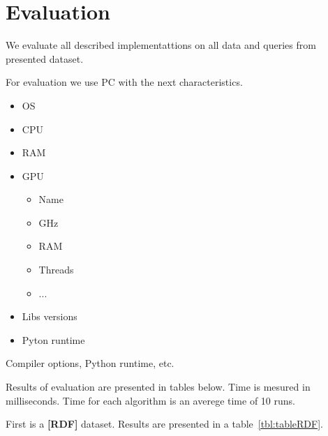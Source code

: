 \section{Evaluation}

We evaluate all described implementattions on all data and queries from presented dataset.

For evaluation we use PC with the next characteristics.
\begin{itemize}
  \item OS
  \item CPU
  \item RAM
  \item GPU
   \begin{itemize}
    \item Name
    \item GHz
    \item RAM
    \item Threads
    \item ...
   \end{itemize}
  \item Libs versions
  \item Pyton runtime
\end{itemize}

Compiler options, Python runtime, etc.

Results of evaluation are presented in tables below.
Time is mesured in milliseconds.
Time for each algorithm is an averege time of 10 runs.

First is a \textbf{[RDF]} dataset.
Results are presented in a table~\ref{tbl:tableRDF}.


